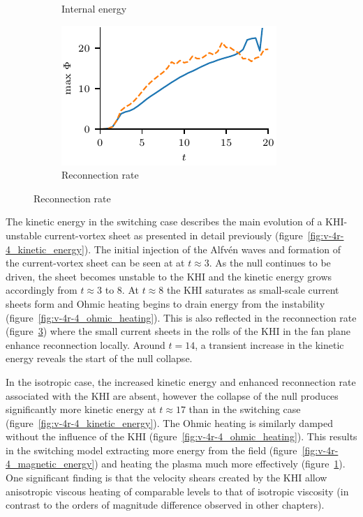 \begin{figure}[t]
\begin{subfigure}{0.32\textwidth}
    \caption{Internal energy}%
    \label{fig:v-4r-4_internal_energy}
  \end{subfigure}
  \hfill
  \begin{subfigure}{0.32\textwidth}
    \includegraphics[width=\linewidth]{v-4r-4_reconn_rate_over_time}
    \caption{Reconnection rate}%
    \label{fig:v-4r-4_reconn_rate_over_time}
  \end{subfigure}
\end{figure}

The kinetic energy in the switching case describes the main evolution of a KHI-unstable current-vortex sheet as presented in detail previously (figure~\ref{fig:v-4r-4_kinetic_energy}). The initial injection of the Alfv\'en waves and formation of the current-vortex sheet can be seen at at $t\approx3$. As the null continues to be driven, the sheet becomes unstable to the KHI and the kinetic energy grows accordingly from $t\approx3$ to $8$. At $t\approx 8$ the KHI saturates as small-scale current sheets form and Ohmic heating begins to drain energy from the instability (figure~\ref{fig:v-4r-4_ohmic_heating}). This is also reflected in the reconnection rate (figure~\ref{fig:v-4r-4_reconn_rate_over_time}) where the small current sheets in the rolls of the KHI in the fan plane enhance reconnection locally. Around $t=14$, a transient increase in the kinetic energy reveals the start of the null collapse. 

In the isotropic case, the increased kinetic energy and enhanced reconnection rate associated with the KHI are absent, however the collapse of the null produces significantly more kinetic energy at $t\approx 17$ than in the switching case (figure~\ref{fig:v-4r-4_kinetic_energy}). The Ohmic heating is similarly damped without the influence of the KHI (figure~\ref{fig:v-4r-4_ohmic_heating}). This results in the switching model extracting more energy from the field (figure~\ref{fig:v-4r-4_magnetic_energy}) and heating the plasma much more effectively (figure~\ref{fig:v-4r-4_internal_energy}). One significant finding is that the velocity shears created by the KHI allow anisotropic viscous heating of comparable levels to that of isotropic viscosity (in contrast to the orders of magnitude difference observed in other chapters). 

